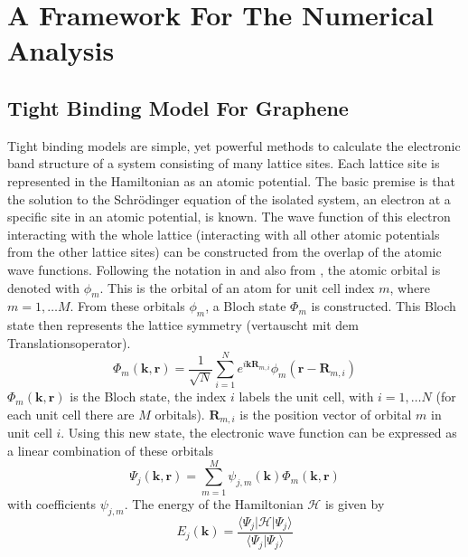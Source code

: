 \chapter{A Framework For The Numerical Analysis}
\label{ch:basics-numerical}
\section{Tight Binding Model For Graphene}
Tight binding models are simple, yet powerful methods to calculate the electronic band structure of a system consisting of many lattice sites. Each lattice site is represented in the Hamiltonian as an atomic potential. 
The basic premise is that the solution to the Schr\"odinger equation of the isolated system, an electron at a specific site in an atomic potential, is known. The wave function of this electron interacting with the whole lattice (interacting with all other atomic potentials from the other lattice sites) can be constructed from the overlap of the atomic wave functions. 
Following the notation in \cite{McCann2012} and also from \cite{CastroNeto2009}, the atomic orbital is denoted with $\phi_m$. This is the orbital of an atom for unit cell index $m$, where $m = 1, \dots M$. From these orbitals $\phi_m$, a Bloch state $\Phi_m$ is constructed. This Bloch state then represents the lattice symmetry (vertauscht mit dem Translationsoperator).
\begin{equation}
\Phi_m \left( \mathbf{k}, \mathbf{r} \right) = \frac{1}{\sqrt{N}} \sum_{i = 1}^N e^{i \mathbf{k} \mathbf{R}_{m, i}} \phi _m \left( \mathbf{r} - \mathbf{R}_{m, i} \right)
\end{equation}
$\Phi_m \left( \mathbf{k}, \mathbf{r} \right)$ is the Bloch state, the index $i$ labels the unit cell, with $i = 1, \dots N$ (for each unit cell there are $M$ orbitals). $\mathbf{R}_{m, i}$ is the position vector of orbital $m$ in unit cell $i$. Using this new state, the electronic wave function can be expressed as a linear combination of these orbitals
\begin{equation}
\Psi_j \left( \mathbf{k}, \mathbf{r} \right) = \sum_{m=1}^M \psi_{j, m} \left( \mathbf{k} \right) \Phi_m \left( \mathbf{k}, \mathbf{r} \right) 
\end{equation}
with coefficients $\psi_{j, m}$.
The energy of the Hamiltonian $\mathcal{H}$ is given by 
\begin{equation}
E_j \left( \mathbf{k} \right) = \frac{\langle \Psi_j| \mathcal{H} | \Psi_j \rangle}{\langle \Psi_j | \Psi_j \rangle}
\end{equation}
